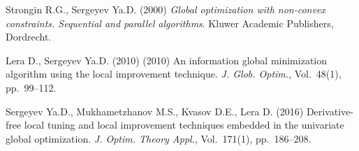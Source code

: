 \documentclass[oribibl]{llncs}
\begin{document}
\vspace{0.5cm}

\begin{thebibliography}{4}

 Strongin R.G., Sergeyev Ya.D. (2000) \emph{Global optimization with non-convex constraints. Sequential and parallel algorithms}. Kluwer Academic Publishers, Dordrecht.

 Lera D., Sergeyev Ya.D. (2010)  (2010) An information global minimization algorithm using the local improvement technique. \emph{J. Glob. Optim.}, Vol.~48(1), pp.~99--112.

 Sergeyev Ya.D., Mukhametzhanov M.S., Kvasov D.E., Lera D. (2016) Derivative-free local tuning and local improvement techniques embedded in the univariate global optimization. \emph{J. Optim. Theory Appl.}, Vol.~171(1), pp.~186--208.



\end{thebibliography}
\end{document}
